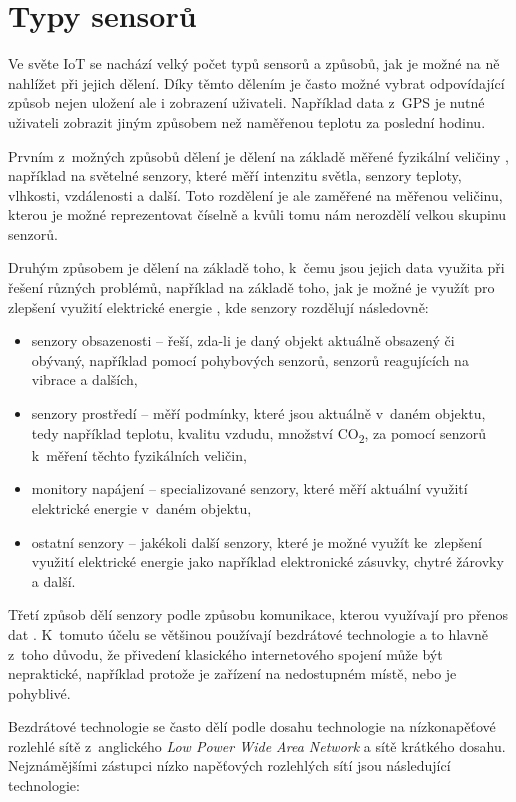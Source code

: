 \section{Typy sensorů}
Ve světe IoT se nachází velký počet typů sensorů a způsobů, jak je možné na ně nahlížet při jejich dělení. Díky těmto dělením je často možné vybrat odpovídající způsob nejen uložení ale i zobrazení uživateli. Například data z~GPS je nutné uživateli zobrazit jiným způsobem než naměřenou teplotu za poslední hodinu.

Prvním z~možných způsobů dělení je dělení na základě měřené fyzikální veličiny \cite{8862778}, například na světelné senzory, které měří intenzitu světla, senzory teploty, vlhkosti, vzdálenosti a další. Toto rozdělení je ale zaměřené na měřenou veličinu, kterou je možné reprezentovat číselně a kvůli tomu nám nerozdělí velkou skupinu senzorů.

Druhým způsobem je dělení na základě toho, k~čemu jsou jejich data využita při řešení různých problémů, například na základě toho, jak je možné je využít pro zlepšení využití elektrické energie \cite{7946568}, kde senzory rozdělují následovně:
\begin{itemize}
\item senzory obsazenosti -- řeší, zda-li je daný objekt aktuálně obsazený či obývaný, například pomocí pohybových senzorů, senzorů reagujících na vibrace a dalších,
\item senzory prostředí -- měří podmínky, které jsou aktuálně v~daném objektu, tedy například teplotu, kvalitu vzdudu, množství CO\textsubscript{2}, za pomocí senzorů k~měření těchto fyzikálních veličin,
\item monitory napájení -- specializované senzory, které měří aktuální využití elektrické energie v~daném objektu,

\item ostatní senzory -- jakékoli další senzory, které je možné využít ke~zlepšení využití elektrické energie jako například elektronické zásuvky, chytré žárovky a další.
\end{itemize}

Třetí způsob dělí senzory podle způsobu komunikace, kterou využívají pro přenos dat \cite{8079928}. K~tomuto účelu se většinou používají bezdrátové technologie a to hlavně z~toho důvodu, že přivedení klasického internetového spojení může být nepraktické, například protože je zařízení na nedostupném místě, nebo je pohyblivé. 

Bezdrátové technologie se často dělí podle dosahu technologie na nízkonapěťové rozlehlé sítě z~anglického \textit{Low Power Wide Area Network} a sítě krátkého dosahu. Nejznámějšími zástupci nízko napěťových rozlehlých sítí jsou následující technologie:

